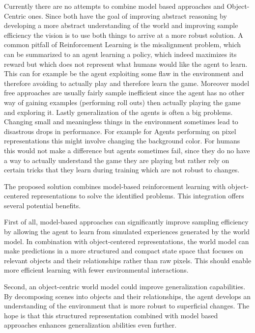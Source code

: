 \documentclass[
	english,
	ruledheaders=section,
	class=report,
	thesis={type=master},
	accentcolor=9c,
	custommargins=true,
	marginpar=false,
	parskip=half-,
	fontsize=11pt,
]{tudapub}
\begin{document}
Currently there are no attempts to combine model based approaches and Object-Centric ones. Since both have the goal of improving abstract reasoning by developing a more abstract understanding
 of the world and improving sample efficiency the vision is to use both things to arrive at a more robust solution.
A common pitfall of Reinforcement Learning is the misalignment problem, which can be summarized to an agent learning a policy, which indeed maximizes its reward but which does not represent
 what humans would like the agent to learn. This can for example be the agent exploiting some flaw in the environment and therefore avoiding to actually play and therefore learn the game.
  Moreover model free approaches are usually fairly sample inefficient since the agent has no other way of gaining examples (performing roll outs) then actually playing the game and exploring it.
Lastly generalization of the agents is often a big problems. Changing small and meaningless things in the environment sometimes lead to disastrous drops in performance. For example for Agents
 performing on pixel representations this might involve changing the background color. For humans this would not make a difference but agents sometimes fail, since they do no have a way to 
 actually understand the game they are playing but rather rely on certain tricks that they learn during training which are not robust to changes.

The proposed solution combines model-based reinforcement learning with object-centered representations to solve the identified problems. This integration offers several potential benefits.

First of all, model-based approaches can significantly improve sampling efficiency by allowing the agent to learn from simulated experiences generated by the world model. In combination with object-centered representations,
 the world model can make predictions in a more structured and compact state space that focuses on relevant objects and their relationships rather than raw pixels. This should enable more efficient learning with fewer environmental interactions.

Second, an object-centric world model could improve generalization capabilities. By decomposing scenes into objects and their relationships, the agent develops an understanding of the environment that is more robust to
 superficial changes. The hope is that this structured representation combined with model based approaches enhances generalization abilities even further.
\end{document}
